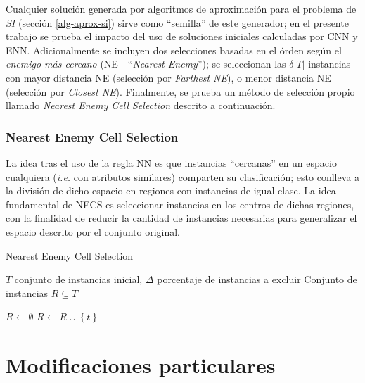 Cualquier solución generada por algoritmos de aproximación para el problema de \emph{SI} (sección \ref{alg-aprox-si}) sirve como ``semilla'' de este generador; en el presente trabajo se prueba el impacto del uso de soluciones iniciales calculadas por CNN y ENN. Adicionalmente se incluyen dos selecciones basadas en el órden según el \emph{enemigo más cercano} (NE - ``\emph{Nearest Enemy}''); se seleccionan las $\delta \vert T \vert$ instancias con mayor distancia NE (selección por \emph{Farthest NE}), o menor distancia NE (selección por \emph{Closest NE}). Finalmente, se prueba un método de selección propio llamado \emph{Nearest Enemy Cell Selection} descrito a continuación.

\subsubsection{Nearest Enemy Cell Selection}

La idea tras el uso de la regla NN es que instancias ``cercanas'' en un espacio cualquiera (\emph{i.e.} con atributos similares) comparten su clasificación; esto conlleva a la división de dicho espacio en regiones con instancias de igual clase. La idea fundamental de NECS es seleccionar instancias en los centros de dichas regiones, con la finalidad de reducir la cantidad de instancias necesarias para generalizar el espacio descrito por el conjunto original.

\begin{algorithm}
\caption{Nearest Enemy Cell Selection}
\label{necs-alg}
\begin{algorithmic}[1]

\Require $T$ conjunto de instancias inicial, $\Delta$ porcentaje de instancias a excluir
\Ensure Conjunto de instancias $R \subseteq T$

\State $R \gets \emptyset$
		\State $R \gets R \cup \left\lbrace t \right\rbrace$
	\EndIf
\EndFor
\State {}
\end{algorithmic}
\end{algorithm}

\section{Modificaciones particulares}

